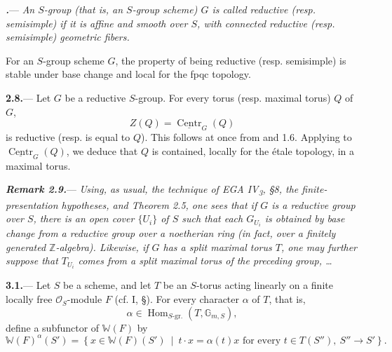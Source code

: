 \par\medskip\noindent
\textbf{\textit{.}}---
\textit{An \(S\)-group \textup{(that is, an \(S\)-group scheme)}
\(G\) is called \emph{reductive} \textup{(resp. \emph{semisimple})}
if it is affine and smooth over \(S\), with connected reductive
\textup{(resp. semisimple)} geometric fibers.}

For an \(S\)-group scheme \(G\), the property of being reductive
(resp. semisimple) is stable under base change and local for the fpqc
topology.

\par\medskip\noindent
\textbf{2.8.}---
Let \(G\) be a reductive \(S\)-group.  For every torus
(resp. maximal torus) \(Q\) of \(G\),
\[
  Z(Q)=\underline{\operatorname{Centr}}_G(Q)
\]
is reductive (resp. is equal to \(Q\)).  This follows at once from 
and 1.6.  Applying  to
\(\underline{\operatorname{Centr}}_G(Q)\), we deduce that \(Q\) is
contained, locally for the étale topology, in a maximal torus.

\par\medskip\noindent
\textbf{\textit{Remark 2.9.}}---
\textit{Using, as usual, the technique of EGA IV\textsubscript{3},
§8, the finite-presentation hypotheses, and Theorem 2.5, one sees
that if \(G\) is a reductive group over \(S\), there is an open cover
\(\{U_i\}\) of \(S\) such that each \(G_{U_i}\) is obtained by base
change from a reductive group over a noetherian ring \textup{(in fact,
over a finitely generated \(\mathbb Z\)-algebra)}.  Likewise, if \(G\)
has a split maximal torus \(T\), one may further suppose that
\(T_{U_i}\) comes from a split maximal torus of the preceding
group, \ldots}




\par\medskip\noindent
\textbf{3.1.}---
Let \(S\) be a scheme, and let \(T\) be an \(S\)-torus acting linearly
on a finite locally free \(\mathcal O_S\)-module \(F\) (cf. I, §).
For every character \(\alpha\) of \(T\), that is,
\[
  \alpha\in
  \operatorname{Hom}_{S\text{-gr.}}(T,\mathbb G_{m,S}),
\]
define a subfunctor of \(\mathbb W(F)\) by
\[
  \mathbb W(F)^\alpha(S')
  =
  \left\{
    x\in\mathbb W(F)(S')
    \ \middle|\
    t\cdot x=\alpha(t)x
    \text{ for every }t\in T(S''),\ S''\to S'
  \right\}.
\]

